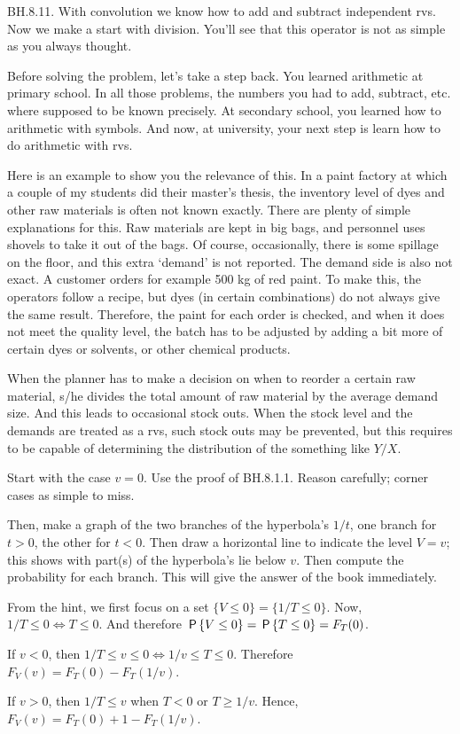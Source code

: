 \begin{exercise} BH.8.11. With convolution we know how to  add and subtract independent rvs. Now we make a start with division. You'll see that this operator is not as simple as you always thought.

Before solving the problem, let's take a step back.
You learned arithmetic at primary school.
In all those problems, the numbers you had to add, subtract, etc.
where supposed to be known precisely.
At secondary school, you learned how to arithmetic with symbols.
And now, at university, your next step is learn how to do arithmetic with rvs.

Here is an example to show you the relevance of this.
In a paint factory at which a couple of my students did their master's thesis, the inventory level of dyes and other raw materials is often not known exactly.
There are plenty of simple explanations for this.
Raw materials are kept in big bags, and personnel uses shovels to take it out of the bags.
Of course, occasionally, there is some spillage on the floor, and this extra `demand' is not reported.
The demand side is also not exact.
A customer orders for example 500 kg of red paint.
To make this, the operators follow a recipe, but dyes (in certain combinations) do not always give the same  result. Therefore, the paint for each order is checked, and when it does not meet the quality level, the batch has to be adjusted by adding a bit more of certain dyes or solvents, or other chemical products.

When the planner has to make a decision on when to reorder a certain raw material, s/he divides the total amount of raw material by the average demand size. And this leads to occasional stock outs. When the stock level and the demands are treated as a rvs, such stock outs may be prevented, but this requires to be capable of determining the distribution of the something like $Y/X$.

\begin{hint}
Start with the case $v=0$. Use the proof of BH.8.1.1. Reason carefully; corner cases as simple to miss.

Then, make a graph of the two branches of the hyperbola's $1/t$, one branch for $t>0$, the other for $t<0$.
Then draw a horizontal line to indicate the level $V=v$; this shows with part(s) of the hyperbola's lie below $v$.
Then compute the probability for each branch. This will give the answer of the  book immediately.
\end{hint}
\begin{solution}

From the hint, we first focus on a set $\{V\leq 0\} = \{1/T \leq 0\}$. Now,  $1/T\leq 0 \iff T\leq 0$. And therefore $\P{V\leq 0} = \P{T\leq 0} = F_T(0)$.

If $v<0$, then $1/T \leq v \leq 0\iff 1/v \leq T \leq 0$. Therefore
$F_V(v) = F_T(0) - F_T(1/v)$.

If $v>0$, then $1/T \leq v$ when $T<0$ or $T\geq 1/v$. Hence,
$F_V(v) = F_T(0) + 1- F_T(1/v)$.
\end{solution}
\end{exercise}

